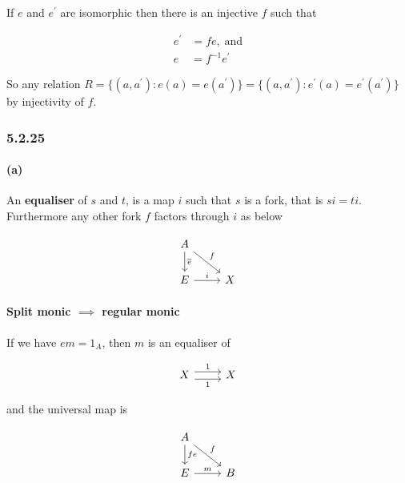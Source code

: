 \documentclass{article}
\begin{document}
If $e$ and $e^\prime$ are isomorphic then there is an injective $f$ such that

\begin{align*}
  e^\prime &= f e, \;\text{and}\\
  e &= f^{-1}e^\prime
\end{align*}

So any relation $R = \{(a,a^\prime)\colon e(a) = e(a^\prime)\} = \{(a,a^\prime)\colon e^\prime(a) = e^\prime(a^\prime)\}$ by injectivity of $f$.

\subsubsection*{5.2.25}
\paragraph{(a)}

An \textbf{equaliser} of $s$ and $t$, is a map $i$ such that $s$ is a fork, that is $si=ti$. Furthermore any other fork $f$ factors through $i$ as below

\begin{equation*}
\begin{tikzcd}
A \arrow[rd,"f"] \arrow[d, "\overline{e}"] & \\
E \arrow[r,"i"] & X
\end{tikzcd}
\end{equation*}

\paragraph{Split monic $\implies$ regular monic}

If we have $em = 1_A$, then $m$ is an equaliser of

\begin{equation*}
\label{eqn5143}
\begin{tikzcd}
  X \ar[r,shift left=.75ex,"1"]
    \ar[r,shift right=.75ex,swap,"1"] & X
\end{tikzcd}
\end{equation*}

and the universal map is

\begin{equation*}
\begin{tikzcd}
A \arrow[rd,"f"] \arrow[d, "fe"] & \\
E \arrow[r,"m"] & B
\end{tikzcd}
\end{equation*}
\end{document}
